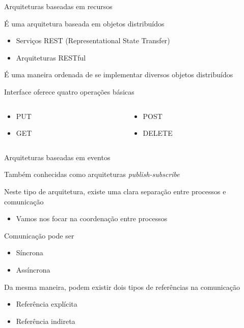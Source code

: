 \documentclass[compress]{beamer}
\begin{document}

\begin{frame}{Arquiteturas baseadas em recursos}

É uma arquitetura baseada em objetos distribuídos
\begin{itemize}
    \item Serviços REST (Representational State Transfer)
    \item Arquiteturas RESTful
\end{itemize}

\vspace{0.5cm}

É uma maneira ordenada de se implementar diversos objetos distribuídos

\vspace{0.5cm}

Interface oferece quatro operações básicas
\begin{columns}[T]
    \begin{column}{.30\textwidth}
        \begin{itemize}
            \item PUT
            \item GET
        \end{itemize}
    \end{column}
    \begin{column}{.58\textwidth}
        \begin{itemize}
            \item POST
            \item DELETE
        \end{itemize}
    \end{column}
\end{columns}
\end{frame}


\begin{frame}{Arquiteturas baseadas em eventos}

Também conhecidas como arquiteturas \textit{publish-subscribe}

Neste tipo de arquitetura, existe uma clara separação entre processos e comunicação
\begin{itemize}
    \item Vamos nos focar na coordenação entre processos
\end{itemize}

Comunicação pode ser
\begin{itemize}
    \item Síncrona
    \item Assíncrona
\end{itemize}

Da mesma maneira, podem existir dois tipos de referências na comunicação
\begin{itemize}
    \item Referência explícita
    \item Referência indireta
\end{itemize}
\end{frame}
\end{document}
